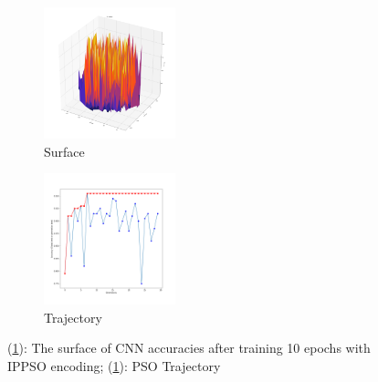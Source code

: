 \documentclass[conference]{IEEEtran}
\begin{document}
\begin{figure}[t]
	\begin{subfigure}[b]{0.2\textwidth}
		\centering
		\includegraphics[width=1.5in]{ipec_pca_plot_2d_surface}
		\caption{Surface}
		\label{fig:Visual3DSurface}
	\end{subfigure}
	\begin{subfigure}[b]{0.2\textwidth}
		\centering
		\includegraphics[width=1.5in]{trajectory-2in1}
		\caption{Trajectory}
		\label{fig:VisualTrajectory}
	\end{subfigure}
	\caption{(\ref{fig:Visual3DSurface}): The surface of CNN accuracies after training 10 epochs with IPPSO encoding; (\ref{fig:Visual3DSurface}): PSO Trajectory}
\end{figure}
\end{document}
